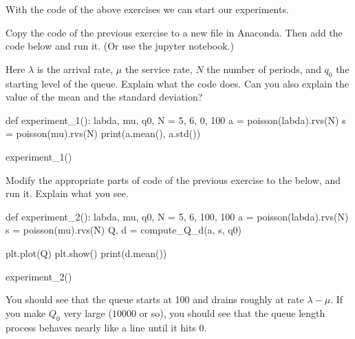 With the code of the above exercises we can start our experiments.

\begin{exercise}\label{ex:4}
  Copy the code of the previous exercise to a new file in Anaconda.
  Then add the code below and run it. (Or use the jupyter notebook.)

  Here $\lambda$ is the arrival rate, $\mu$ the service rate, $N$ the number of periods, and $q_0$ the starting level of the queue.
  Explain what the code does.
  Can you also explain the value of the mean and the standard deviation?

\begin{pyverbatim}
def experiment_1():
    labda, mu, q0, N = 5, 6, 0, 100
    a = poisson(labda).rvs(N)
    s = poisson(mu).rvs(N)
    print(a.mean(), a.std())


experiment_1()
\end{pyverbatim}

\end{exercise}

\begin{exercise}
  Modify  the appropriate parts of  code of the previous exercise to the below,  and run it. Explain what you see.

\begin{pyverbatim}
def experiment_2():
    labda, mu, q0, N = 5, 6, 100, 100
    a = poisson(labda).rvs(N)
    s = poisson(mu).rvs(N)
    Q, d = compute_Q_d(a, s, q0)

    plt.plot(Q)
    plt.show()
    print(d.mean())


experiment_2()
\end{pyverbatim}

\begin{solution}
  You should see that the queue starts at 100 and drains roughly at rate $\lambda-\mu$.
  If you make $Q_0$ very large ($10 000$ or so), you should see that the queue length process behaves nearly like a line until it hits 0.
\end{solution}
\end{exercise}


